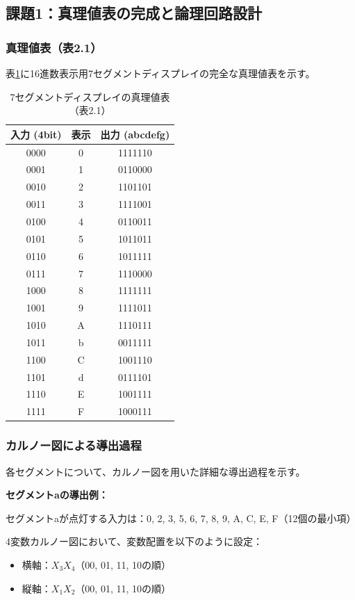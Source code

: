 \documentclass[a4j,dvipdfmx]{jsarticle}
\begin{document}
\subsection{課題1：真理値表の完成と論理回路設計}

\subsubsection{真理値表（表2.1）}

表\ref{tab:truth_table}に16進数表示用7セグメントディスプレイの完全な真理値表を示す。

\begin{table}[H]
\centering
\caption{7セグメントディスプレイの真理値表（表2.1）}
\label{tab:truth_table}
\begin{tabular}{|c|c|c|}
\hline
入力 (4bit) & 表示 & 出力 (abcdefg) \\
\hline
0000 & 0 & 1111110 \\
0001 & 1 & 0110000 \\
0010 & 2 & 1101101 \\
0011 & 3 & 1111001 \\
0100 & 4 & 0110011 \\
0101 & 5 & 1011011 \\
0110 & 6 & 1011111 \\
0111 & 7 & 1110000 \\
1000 & 8 & 1111111 \\
1001 & 9 & 1111011 \\
1010 & A & 1110111 \\
1011 & b & 0011111 \\
1100 & C & 1001110 \\
1101 & d & 0111101 \\
1110 & E & 1001111 \\
1111 & F & 1000111 \\
\hline
\end{tabular}
\end{table}

\subsubsection{カルノー図による導出過程}

各セグメントについて、カルノー図を用いた詳細な導出過程を示す。

\textbf{セグメントaの導出例：}

セグメントaが点灯する入力は：0, 2, 3, 5, 6, 7, 8, 9, A, C, E, F（12個の最小項）

4変数カルノー図において、変数配置を以下のように設定：
\begin{itemize}
\item 横軸：$X_3X_4$（00, 01, 11, 10の順）
\item 縦軸：$X_1X_2$（00, 01, 11, 10の順）
\end{itemize}
\end{document}
